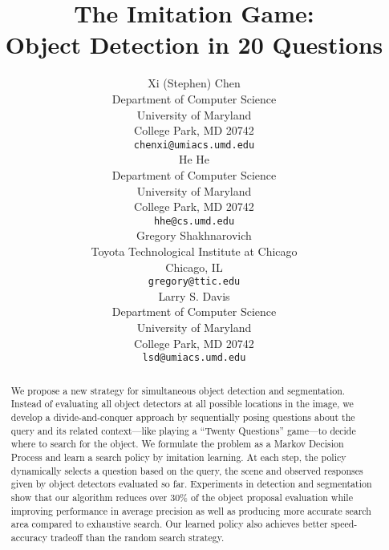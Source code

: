\documentclass{article} %
\title{The Imitation Game:\\ Object Detection in 20 Questions}
\author{
Xi (Stephen) Chen\\
Department of Computer Science\\
University of Maryland\\
College Park, MD 20742 \\
\texttt{chenxi@umiacs.umd.edu} \\
\AND
He He \\
Department of Computer Science\\
University of Maryland\\
College Park, MD 20742 \\
\texttt{hhe@cs.umd.edu} \\
\And
Gregory Shakhnarovich\\
Toyota Technological Institute at Chicago \\
Chicago, IL\\
\texttt{gregory@ttic.edu} \\
\And
Larry S. Davis \\
Department of Computer Science\\
University of Maryland\\
College Park, MD 20742 \\
\texttt{lsd@umiacs.umd.edu} 
}
\theoremstyle{definition}
\begin{document}
\maketitle

\begin{abstract}
We propose a new strategy for simultaneous object detection and segmentation. Instead of evaluating all object detectors at all possible locations in the
image, we develop a divide-and-conquer approach by sequentially posing questions about the query and its related context---like playing a ``Twenty Questions'' game---to decide where to search for the object. We formulate the problem as a Markov Decision Process and learn a search policy by imitation learning. At each step, the policy dynamically selects a question based on the query, the scene and observed responses given by object detectors evaluated so far.
Experiments in detection and segmentation show that our algorithm reduces over 30\% of the object proposal evaluation while improving performance in average precision as well as producing more accurate search area compared to exhaustive search. Our learned policy also achieves better speed-accuracy tradeoff than the random search strategy. 
\end{abstract}












{\small


}
\end{document}
